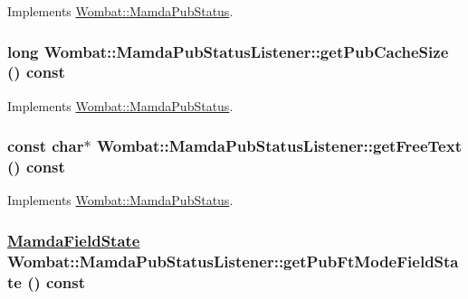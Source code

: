 Implements \hyperlink{classWombat_1_1MamdaPubStatus_96f29e18a6b74143b81a8a523e8bbeea}{Wombat::Mamda\-Pub\-Status}.\hypertarget{classWombat_1_1MamdaPubStatusListener_1ba02d9db2e8b657ec61b6de7d489e07}{
\subsubsection[getPubCacheSize]{\setlength{\rightskip}{0pt plus 5cm}long Wombat::Mamda\-Pub\-Status\-Listener::get\-Pub\-Cache\-Size () const}}
\label{classWombat_1_1MamdaPubStatusListener_1ba02d9db2e8b657ec61b6de7d489e07}




Implements \hyperlink{classWombat_1_1MamdaPubStatus_7edfe04c5f0e4e7b5deba2f68ae47f2e}{Wombat::Mamda\-Pub\-Status}.\hypertarget{classWombat_1_1MamdaPubStatusListener_ac4c3ecbefe9170ecaa873e725cac4f3}{
\subsubsection[getFreeText]{\setlength{\rightskip}{0pt plus 5cm}const char$\ast$ Wombat::Mamda\-Pub\-Status\-Listener::get\-Free\-Text () const}}
\label{classWombat_1_1MamdaPubStatusListener_ac4c3ecbefe9170ecaa873e725cac4f3}




Implements \hyperlink{classWombat_1_1MamdaPubStatus_b64900c7cdfbf708a639036dc0251165}{Wombat::Mamda\-Pub\-Status}.\hypertarget{classWombat_1_1MamdaPubStatusListener_b377a65c443b4a09b13d0e6a7c269ee9}{
\subsubsection[getPubFtModeFieldState]{\setlength{\rightskip}{0pt plus 5cm}\hyperlink{namespaceWombat_93aac974f2ab713554fd12a1fa3b7d2a}{Mamda\-Field\-State} Wombat::Mamda\-Pub\-Status\-Listener::get\-Pub\-Ft\-Mode\-Field\-State () const}}
\label{classWombat_1_1MamdaPubStatusListener_b377a65c443b4a09b13d0e6a7c269ee9}


